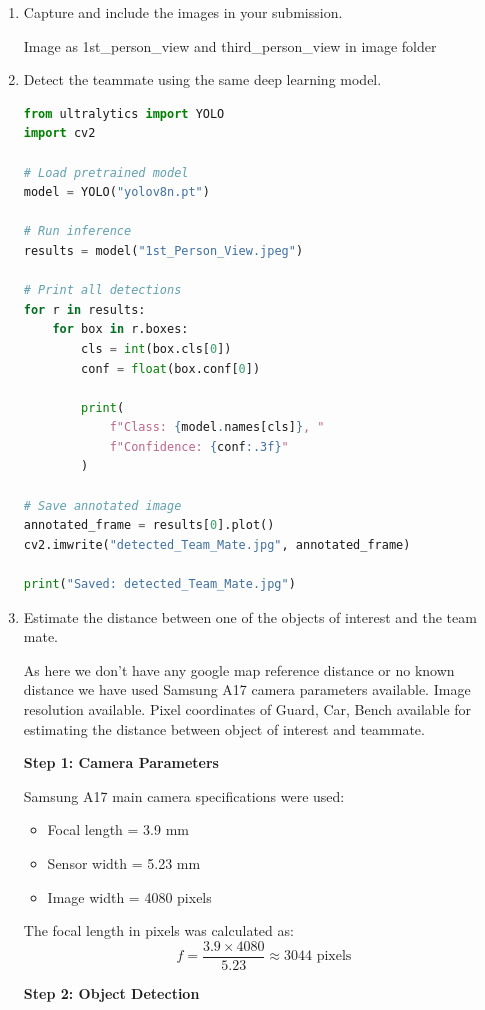 \documentclass[12pt,a4paper]{article}
\newenvironment{studentSpace}{\par\medskip\noindent}{\par\bigskip}
\begin{document}
\begin{enumerate}
\item Capture and include the images in your submission.

Image as 1st_person_view and third_person_view in image folder

\item Detect the teammate using the same deep learning model.

\begin{lstlisting}[language=Python]
from ultralytics import YOLO
import cv2

# Load pretrained model
model = YOLO("yolov8n.pt")

# Run inference
results = model("1st_Person_View.jpeg")

# Print all detections
for r in results:
    for box in r.boxes:
        cls = int(box.cls[0])
        conf = float(box.conf[0])

        print(
            f"Class: {model.names[cls]}, "
            f"Confidence: {conf:.3f}"
        )

# Save annotated image
annotated_frame = results[0].plot()
cv2.imwrite("detected_Team_Mate.jpg", annotated_frame)

print("Saved: detected_Team_Mate.jpg")
\end{lstlisting}

\item Estimate the distance between one of the objects of interest and the team mate.

\begin{studentSpace}
As here we don't have any google map reference distance or no known distance we have used Samsung A17 camera parameters available.
Image resolution available.
Pixel coordinates of Guard, Car, Bench available for estimating the distance between object of interest and teammate.

\textbf{Step 1: Camera Parameters}

Samsung A17 main camera specifications were used:
\begin{itemize}
\item Focal length = 3.9 mm
\item Sensor width = 5.23 mm
\item Image width = 4080 pixels
\end{itemize}
The focal length in pixels was calculated as:
\[
f = \frac{3.9 \times 4080}{5.23} \approx 3044 \text{ pixels}
\]

\textbf{Step 2: Object Detection}


\end{studentSpace}
\end{enumerate}
\end{document}
